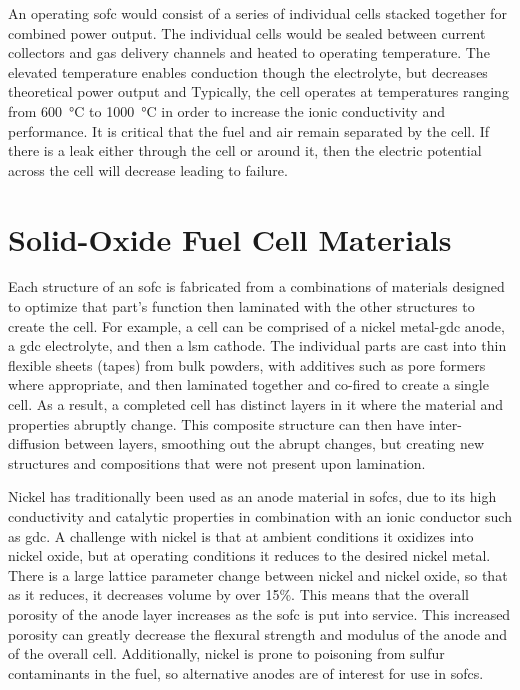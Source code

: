 An operating \gls{sofc} would consist of a series of individual cells stacked together for combined power output.
The individual cells would be sealed between current collectors and gas delivery channels and heated to operating temperature.
The elevated temperature enables conduction though the electrolyte, but decreases theoretical power output and
Typically, the cell operates at temperatures ranging from \SI{600}{\celsius} to \SI{1000}{\celsius} in order to increase the ionic conductivity and performance.
It is critical that the fuel and air remain separated by the cell.
If there is a leak either through the cell or around it, then the electric potential across the cell will decrease leading to failure.


\section{Solid-Oxide Fuel Cell Materials}

Each structure of an \gls{sofc} is fabricated from a combinations of materials designed to optimize that part's function then laminated with the other structures to create the cell.
For example, a cell can be comprised of a nickel metal-\gls{gdc} anode, a \gls{gdc} electrolyte, and then a \gls{lsm} cathode.\cite{Liu2002,Haile2003}
The individual parts are cast into thin flexible sheets (tapes) from bulk powders, with additives such as pore formers where appropriate, and then laminated together and co-fired to create a single cell.
As a result, a completed cell has distinct layers in it where the material and properties abruptly change.
This composite structure can then have inter-diffusion between layers, smoothing out the abrupt changes, but creating new structures and compositions that were not present upon lamination.\cite{Yokokawa2008}

Nickel has traditionally been used as an anode material in \glspl{sofc}, due to its high conductivity and catalytic properties in combination with an ionic conductor such as \gls{gdc}. %
A challenge with nickel is that at ambient conditions it oxidizes into nickel oxide, but at operating conditions it reduces to the desired nickel metal.
There is a large lattice parameter change between nickel and nickel oxide, so that as it reduces, it decreases volume by over 15\%.
This means that the overall porosity of the anode layer increases as the \gls{sofc} is put into service.\cite{Gutierrez-Mora2002,Yu2007}
This increased porosity can greatly decrease the flexural strength and modulus of the anode and of the overall cell.\cite{Callister2014,Barsoum2003}
Additionally, nickel is prone to poisoning from sulfur contaminants in the fuel, so alternative anodes are of interest for use in \glspl{sofc}.

